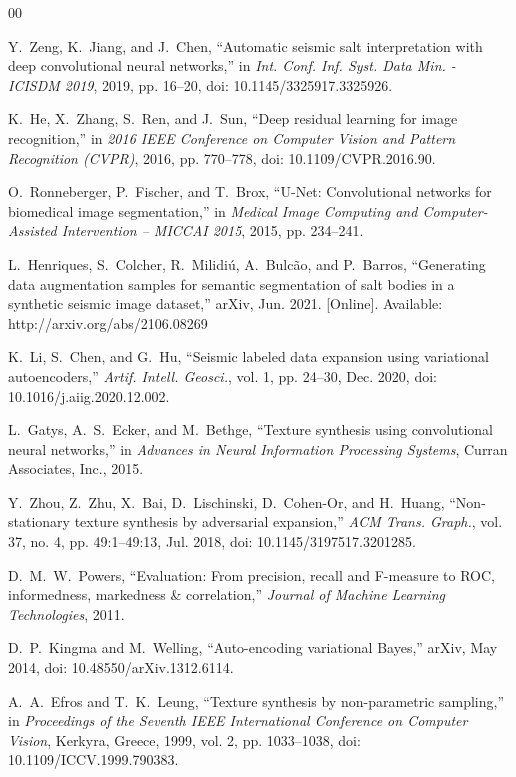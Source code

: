 \documentclass{ieeeaccess}
\begin{document}
\begin{thebibliography}{00}

Y.~Zeng, K.~Jiang, and J.~Chen, ``Automatic seismic salt interpretation with deep convolutional neural networks,'' in \emph{Int. Conf. Inf. Syst. Data Min. - ICISDM 2019}, 2019, pp. 16--20, doi: 10.1145/3325917.3325926.

K.~He, X.~Zhang, S.~Ren, and J.~Sun, ``Deep residual learning for image recognition,'' in \emph{2016 IEEE Conference on Computer Vision and Pattern Recognition (CVPR)}, 2016, pp. 770--778, doi: 10.1109/CVPR.2016.90.

O.~Ronneberger, P.~Fischer, and T.~Brox, ``U-Net: Convolutional networks for biomedical image segmentation,'' in \emph{Medical Image Computing and Computer-Assisted Intervention -- MICCAI 2015}, 2015, pp. 234--241.

L.~Henriques, S.~Colcher, R.~Milidiú, A.~Bulcão, and P.~Barros, ``Generating data augmentation samples for semantic segmentation of salt bodies in a synthetic seismic image dataset,'' arXiv, Jun. 2021. [Online]. Available: http://arxiv.org/abs/2106.08269

K.~Li, S.~Chen, and G.~Hu, ``Seismic labeled data expansion using variational autoencoders,'' \emph{Artif. Intell. Geosci.}, vol. 1, pp. 24--30, Dec. 2020, doi: 10.1016/j.aiig.2020.12.002.

L.~Gatys, A.~S.~Ecker, and M.~Bethge, ``Texture synthesis using convolutional neural networks,'' in \emph{Advances in Neural Information Processing Systems}, Curran Associates, Inc., 2015.

Y.~Zhou, Z.~Zhu, X.~Bai, D.~Lischinski, D.~Cohen-Or, and H.~Huang, ``Non-stationary texture synthesis by adversarial expansion,'' \emph{ACM Trans. Graph.}, vol. 37, no. 4, pp. 49:1--49:13, Jul. 2018, doi: 10.1145/3197517.3201285.

D.~M.~W.~Powers, ``Evaluation: From precision, recall and F-measure to ROC, informedness, markedness \& correlation,'' \emph{Journal of Machine Learning Technologies}, 2011.

D.~P.~Kingma and M.~Welling, ``Auto-encoding variational Bayes,'' arXiv, May 2014, doi: 10.48550/arXiv.1312.6114.

A.~A.~Efros and T.~K.~Leung, ``Texture synthesis by non-parametric sampling,'' in \emph{Proceedings of the Seventh IEEE International Conference on Computer Vision}, Kerkyra, Greece, 1999, vol. 2, pp. 1033--1038, doi: 10.1109/ICCV.1999.790383.


\end{thebibliography}
\end{document}
